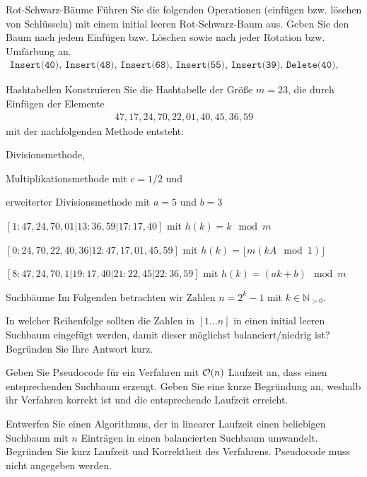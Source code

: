 \documentclass{article}
\begin{document}
\begin{exercise}{Rot-Schwarz-Bäume}
  Führen Sie die folgenden Operationen (einfügen bzw. löschen von Schlüsseln) mit einem initial leeren Rot-Schwarz-Baum aus. Geben Sie den Baum nach jedem Einfügen bzw. Löschen sowie nach jeder Rotation bzw. Umfärbung an.
  \begin{align*}\texttt{Insert(40), Insert(48), Insert(68), Insert(55), Insert(39), Delete(40), Delete(48)}\end{align*}

  \begin{solution}
    
  \end{solution}
\end{exercise}

\begin{eexercises}{Hashtabellen}{
    Konstruieren Sie die Hashtabelle der Größe $m = 23$, die durch Einfügen der Elemente
    \begin{align*}47, 17, 24, 70, 22, 01, 40, 45, 36, 59\end{align*}
    mit der nachfolgenden Methode entsteht:
  }
  \item Divisionsmethode,
  \item Multiplikationsmethode mit $c = 1/2$ und
  \item erweiterter Divisionsmethode mit $a = 5$ und $b = 3$
\end{eexercises}

\begin{solutions}
  \item $[1: 47,24,70,01|13: 36,59|17: 17,40]$ mit $h(k) = k \mod m$
  \item $[0: 24,70,22,40,36|12:47,17,01,45,59]$ mit $h(k) = \lfloor m(kA \mod 1) \rfloor$
  \item $[8: 47,24,70,1|19: 17,40|21: 22,45|22: 36,59]$ mit $h(k) = (ak+b) \mod m$
\end{solutions}

\begin{eexercises}{Suchbäume}{
    Im Folgenden betrachten wir Zahlen $n = 2^k - 1$ mit $k \in \mathbb{N}_{>0}$.
  }
  \item In welcher Reihenfolge sollten die Zahlen in $[1\dots n]$ in einen initial leeren Suchbaum eingefügt werden, damit dieser möglichst balanciert/niedrig ist? Begründen Sie Ihre Antwort kurz.
  \item\label{suchbäume:2} Geben Sie Pseudocode für ein Verfahren mit $\mathcal{O}(n)$ Laufzeit an, dass einen entsprechenden Suchbaum erzeugt. Geben Sie eine kurze Begründung an, weshalb ihr Verfahren korrekt ist und die entsprechende Laufzeit erreicht.
  \item Entwerfen Sie einen Algorithmus, der in linearer Laufzeit einen beliebigen Suchbaum mit $n$ Einträgen in einen balancierten Suchbaum umwandelt. Begründen Sie kurz Laufzeit und Korrektheit des Verfahrens. Pseudocode muss nicht angegeben werden.
\end{eexercises}
\end{document}
